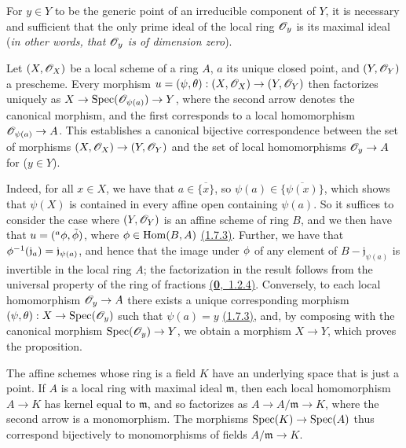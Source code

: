 \begin{cor}[2.4.3]
\label{cor-1.2.4.3}
For $y\in Y$ to be the generic point of an
irreducible component of $Y$, it is necessary and sufficient that the only prime
ideal of the local ring $\mathscr{O}_y$ is its maximal ideal ({\em in other words, that
$\mathscr{O}_y$ is of {\em dimension zero}}).
\end{cor}

\begin{prop}[2.4.4]
\label{prop-1.2.4.4}
Let $(X,\mathscr{O}_X)$ be a local scheme of a ring
$A$, $a$ its unique closed point, and $(Y,\mathscr{O}_Y)$ a prescheme. Every morphism
$u=(\psi,\theta):(X,\mathscr{O}_X)\to(Y,\mathscr{O}_Y)$ then factorizes uniquely as
$X\to{\mathop{\mathrm{Spec}}\nolimits}(\mathscr{O}_{\psi(a)})\to Y$, where the second arrow denotes the canonical
morphism, and the first corresponds to a local homomorphism $\mathscr{O}_{\psi(a)}\to A$.
This establishes a canonical bijective correspondence between the set of
morphisms $(X,\mathscr{O}_X)\to(Y,\mathscr{O}_Y)$ and the set of local homomorphisms $\mathscr{O}_y\to A$
for ($y\in Y$).
\end{prop}

Indeed, for all $x\in X$, we have that $a\in\overline{\{x\}}$, so
$\psi(a)\in\overline{\{\psi(x)\}}$, which shows that $\psi(X)$ is contained in
every affine open containing $\psi(a)$. So it suffices to consider the case
where $(Y,\mathscr{O}_Y)$ is an affine scheme of ring $B$, and we then have that
$u=({}^a\phi,\tilde{\phi})$, where $\phi\in{\mathop{\mathrm{Hom}}\nolimits}(B,A)$ \hyperref[thm-1.1.7.3]{(1.7.3)}. Further,
we have that $\phi^{-1}(\mathfrak{j}_a)=\mathfrak{j}_{\psi(a)}$, and hence
that the image under $\phi$ of any element of
$B-\mathfrak{j}_{\psi(a)}$ is invertible in the local ring $A$; the
factorization in the result follows from the universal property of the ring of
fractions \hyperref[env-0.1.2.4]{(\textbf{0},~1.2.4)}. Conversely, to each local homomorphism
$\mathscr{O}_y\to A$ there exists a unique corresponding morphism
$(\psi,\theta):X\to{\mathop{\mathrm{Spec}}\nolimits}(\mathscr{O}_y)$ such that $\psi(a)=y$ \hyperref[thm-1.1.7.3]{(1.7.3)}, and,
by composing with the canonical morphism ${\mathop{\mathrm{Spec}}\nolimits}(\mathscr{O}_y)\to Y$, we obtain a morphism
$X\to Y$, which proves the proposition.

\begin{env}[2.4.5]
\label{env-1.2.4.5}
The affine schemes whose ring is a field $K$ have an
underlying space that is just a point. If $A$ is a local ring with maximal
ideal $\mathfrak{m}$, then each local homomorphism $A\to K$ has kernel equal to
$\mathfrak{m}$, and so factorizes as $A\to A/\mathfrak{m}\to K$, where the
second arrow is a monomorphism. The morphisms ${\mathop{\mathrm{Spec}}\nolimits}(K)\to{\mathop{\mathrm{Spec}}\nolimits}(A)$ thus
correspond bijectively to monomorphisms of fields $A/\mathfrak{m}\to K$.
\end{env}

